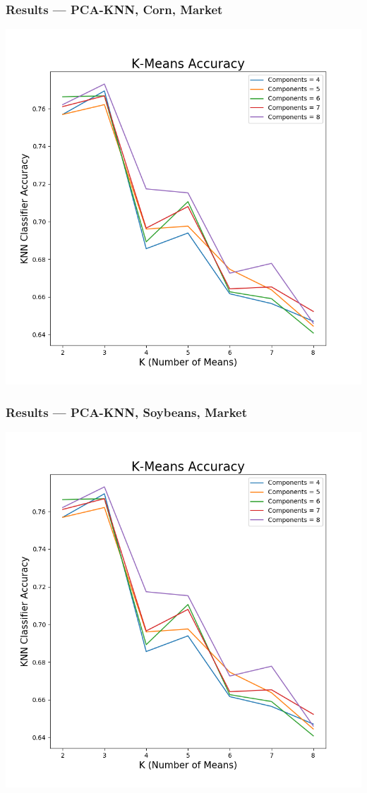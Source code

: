 \documentclass{beamer}
\begin{document}
\begin{frame}
\frametitle{Results ---  PCA-KNN, Corn, Market}
\begin{center}
\includegraphics[scale=.4]{images/cornacc4,8,m}
\end{center}
\end{frame}

\begin{frame}
\frametitle{Results ---  PCA-KNN, Soybeans, Market}
\begin{center}
\includegraphics[scale=.4]{images/soyacc4,8,m}
\end{center}
\end{frame}
\end{document}
